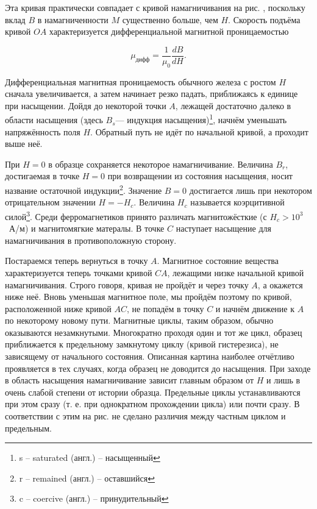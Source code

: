Эта кривая практически совпадает с кривой намагничивания на рис. , поскольку вклад $B$ в намагниченности $M$ существенно больше, чем $H$. Скорость подъёма кривой $OA$ характеризуется  дифференциальной магнитной проницаемостью

\begin{equation*}
	\mu_{\text{дифф}} = \frac{1}{\mu_0} \frac{dB}{dH}.
\end{equation*}

Дифференциальная магнитная проницаемость обычного железа с ростом $H$ сначала увеличивается, а затем начинает резко падать, приближаясь к единице при насыщении. Дойдя до некоторой точки $A$, лежащей достаточно далеко в области насыщения (здесь $B_s$— индукция насыщения)\footnote[1]{s -- saturated (англ.) -- насыщенный}, начнём уменьшать напряжённость поля $H$.
 Обратный путь не идёт по начальной кривой, а проходит выше неё.
 
 
При $H = 0$ в образце сохраняется некоторое намагничивание. Величина $B_r$, достигаемая в точке $H = 0$ при возвращении из состояния насыщения, носит название остаточной индукции\footnote[2]{r -- remained (англ.) -- оставшийся}. Значение $B = 0$ достигается лишь при некотором отрицательном значении $H = - H_c$. Величина $H_c$ называется коэрцитивной силой\footnote[3]{c -- coercive (англ.) -- принудительный}. Среди ферромагнетиков принято различать магнитожёсткие (с $H_c > 10^3$~А/м) и магнитомягкие матералы. В точке $C$ наступает насыщение для намагничивания в противоположную сторону.

Постараемся теперь вернуться в точку $A$. Магнитное состояние вещества характеризуется теперь точками кривой $CA$, лежащими низке начальной кривой намагничивания. Строго говоря, кривая не пройдёт и через точку $A$, а окажется ниже неё. Вновь уменьшая магнитное поле, мы пройдём поэтому по кривой, расположенной ниже кривой $AC$, не попадём в точку $C$ и начнём движение к $A$ по некоторому новому пути. Магнитные циклы, таким образом, обычно оказываются незамкнутыми. Многократно проходя один и тот же цикл, образец приближается к предельному замкнутому циклу (кривой гистерезиса), не зависящему от начального состояния. Описанная картина наиболее отчётливо проявляется в тех случаях, когда образец не доводится до насыщения. При заходе в область насыщения намагничивание зависит главным образом от $H$ и лишь в очень слабой степени от истории образца. Предельные циклы устанавливаются при этом сразу (т. е. при однократном прохождении цикла) или почти сразу. В соответствии с этим на рис.  не сделано различия между частным циклом и предельным.

